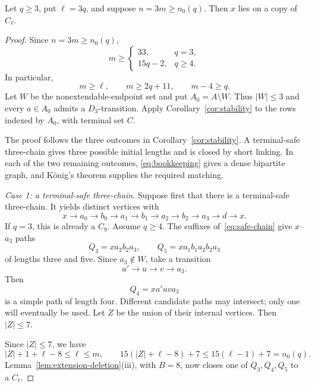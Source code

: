 \documentclass[10pt,a4paper]{amsart}
\begin{document}
\begin{proposition}\label{prop:first-port}
Let $q\ge3$, put $\ell=3q$, and suppose $n=3m\ge n_0(q)$.
Then $x$ lies on a copy of $C_\ell$.
\end{proposition}

\begin{proof}
Since $n=3m\ge n_0(q)$,
\[
  m\ge
  \begin{cases}
    33,&q=3,\\
    15q-2,&q\ge4.
  \end{cases}
\]
In particular,
\begin{equation}\label{eq:first-port-numerics}
  m\ge\ell,\qquad m\ge2q+11,\qquad m-4\ge q.
\end{equation}
Let $W$ be the nonextendable-endpoint set and put $A_0=A\setminus W$.
Thus $|W|\le3$ and every $a\in A_0$ admits a $D_3$-transition.  Apply
Corollary~\ref{cor:stability} to the rows indexed by $A_0$, with terminal
set $C$.

The proof follows the three outcomes in Corollary~\ref{cor:stability}.
A terminal-safe three-chain gives three possible initial lengths and is
closed by short linking.  In each of the two remaining outcomes,
\eqref{eq:bookkeeping} gives a dense bipartite graph, and K\"onig's
theorem supplies the required matching.

\smallskip
\noindent\emph{Case 1: a terminal-safe three-chain.}
Suppose first that there is a terminal-safe three-chain.  It yields distinct vertices with
\begin{equation}\label{eq:safe-chain}
  x\to a_0\to b_0\to a_1\to b_1\to a_2\to b_2\to a_3\to d\to x.
\end{equation}
If $q=3$, this is already a $C_9$.  Assume $q\ge4$.  The suffixes of~\eqref{eq:safe-chain} give $x$--$a_3$ paths
\[
  Q_3=xa_2b_2a_3,\qquad
  Q_5=xa_1b_1a_2b_2a_3
\]
of lengths three and five.  Since $a_3\notin W$, take a transition
\[
  a'\to u\to v\to a_3.
\]
Then
\[
  Q_4=xa'uva_3
\]
is a simple path of length four.  Different candidate paths may intersect; only one will eventually be used.  Let $Z$ be the union of their internal vertices.  Then $|Z|\le7$.

Since $|Z|\le7$, we have
\[
  |Z|+1+\ell-8\le\ell\le m,
  \qquad
  15(|Z|+\ell-8)+7\le15(\ell-1)+7=n_0(q).
\]
Lemma~\ref{lem:extension-deletion}(iii), with $B=8$, now closes one of
$Q_3,Q_4,Q_5$ to a $C_\ell$.


\end{proof}
\end{document}
